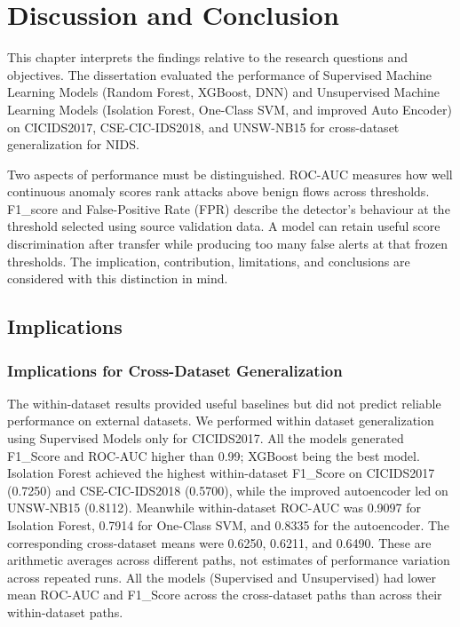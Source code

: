 \chapter{Discussion and Conclusion}
\label{chap:discussion-conclusion}

This chapter interprets the findings relative to the research questions and objectives. The dissertation evaluated the performance of
Supervised Machine Learning Models (Random Forest, XGBoost, DNN) and Unsupervised Machine Learning Models (Isolation Forest, One-Class SVM, and improved 
Auto Encoder) on CICIDS2017, CSE-CIC-IDS2018, and UNSW-NB15 for cross-dataset generalization for NIDS.

Two aspects of performance must be distinguished. ROC-AUC measures how well continuous anomaly scores rank attacks above benign flows 
across thresholds. F1\_score and False-Positive Rate (FPR) describe the detector's behaviour at the threshold selected using source 
validation data. A model can retain useful score discrimination after transfer while producing too many false alerts at that frozen 
thresholds. The implication, contribution, limitations, and conclusions are considered with this distinction in mind.

\section{Implications}
\label{sec:conclusion-implications}

\subsection*{Implications for Cross-Dataset Generalization}

The within-dataset results provided useful baselines but did not predict reliable performance on external datasets. We performed within dataset
generalization using Supervised Models only for CICIDS2017. All the models generated F1\_Score and ROC-AUC higher than 0.99; XGBoost being the best 
model. Isolation Forest achieved the highest within-dataset F1\_Score on CICIDS2017 (0.7250) and CSE-CIC-IDS2018 (0.5700), while the improved 
autoencoder led on UNSW-NB15 (0.8112). Meanwhile within-dataset ROC-AUC was 0.9097 for Isolation Forest, 0.7914 for One-Class SVM, and 0.8335 for the 
autoencoder. The corresponding cross-dataset means were 0.6250, 0.6211, and 0.6490. These are arithmetic averages across different paths, not 
estimates of performance variation across repeated runs.  All the models (Supervised and Unsupervised) had lower mean ROC-AUC and F1\_Score 
across the cross-dataset paths than across their within-dataset paths.

